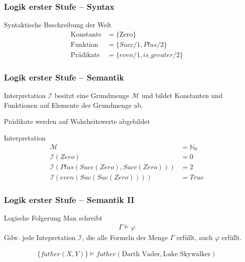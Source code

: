 \begin{frame}
	\frametitle{Logik erster Stufe -- Syntax}

	\begin{block}{Syntaktische Beschreibung der Welt}
		\begin{align*}
			\text{Konstante} &= \{\text{Zero}\}\\
			\text{Funktion}  &=\{Succ/1, Plus/2 \}\\
			\text{Prädikate} &=\{even/1, is\_greater/2 \}
		\end{align*}
	\end{block}

\end{frame}

\begin{frame}
	\frametitle{Logik erster Stufe -- Semantik}
	Interpretation $\mathcal{I}$ besitzt eine Grundmenge $\mathcal{M}$
	und bildet Konstanten und Funktionen auf Elemente der Grundmenge ab.

	Prädikate werden auf Wahrheitswerte abgebildet

	\begin{block}{Interpretation}
		\begin{align*}
			\mathcal{M} &= \mathbb{N}_0\\
			\mathcal{I}(Zero) &= 0\\
			\mathcal{I}(Plus(Succ(Zero), Succ(Zero))) &= 2\\
			\mathcal{I}(even(Suc(Suc(Zero)))) &= True
		\end{align*}
	\end{block}
\end{frame}

\begin{frame}
	\frametitle{Logik erster Stufe -- Semantik II}
	\begin{block}{Logische Folgerung}
		Man schreibt
		\begin{align*}
			\Gamma \vDash \varphi
		\end{align*}
		Gdw. jede Intepretation $\mathcal{I}$, die alle Formeln
		der Menge $\Gamma$ erfüllt, auch $\varphi$ erfüllt.
	\end{block}
	\begin{bsp}
		\begin{align*}
			\{father(X,Y)\} \vDash father(\text{Darth Vader}, \text{Luke Skywalker})
		\end{align*}
	\end{bsp}
\end{frame}

